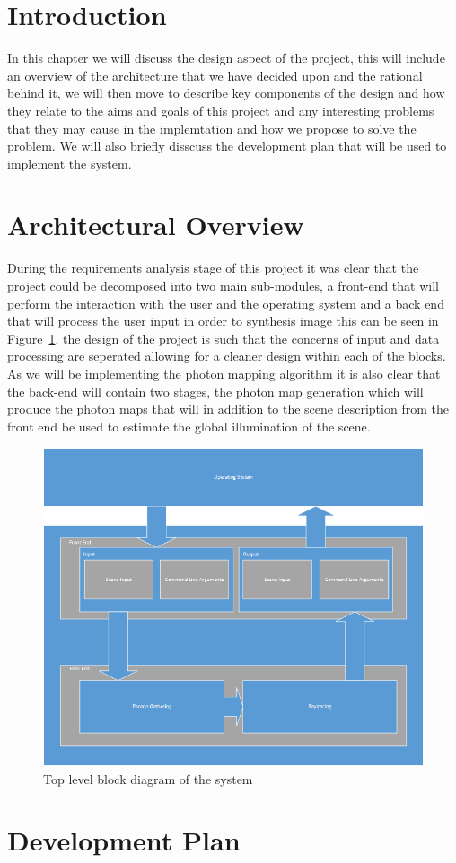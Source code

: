 \section{Introduction}
In this chapter we will discuss the design aspect of the project, this will include an overview of the
architecture that we have decided upon and the rational behind it, we will then move to describe key components of
the design and how they relate to the aims and goals of this project and any interesting problems that they
may cause in the implemtation and how we propose to solve the problem. We will also briefly disscuss the
development plan that will be used to implement the system.

\section{Architectural Overview}
During the requirements analysis stage of this project it was clear that the project could be decomposed into
two main sub-modules, a front-end that will perform the interaction with the user and the operating system and a
back end that will process the user input in order to synthesis image this can be seen in 
Figure~\ref{fig:design_blocks}, the design of the project is such that the concerns of input and data processing
are seperated allowing for a cleaner design within each of the blocks. As we will be implementing the photon mapping
algorithm it is also clear that the back-end will contain two stages, the photon map generation which will produce the
photon maps that will in addition to the scene description from the front end be used to estimate the global illumination
of the scene.

\begin{figure}
\centering
\includegraphics[scale=0.75]{./design/TopLevel.png}
\caption{Top level block diagram of the system}
\label{fig:design_blocks}
\end{figure}

\newpage

\newpage


\section{Development Plan}
